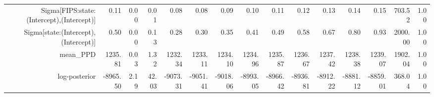 \begin{table}[ht]
\begin{tabular}{rrrrrrrrrrrrrrr}
  Sigma[FIPS:state:(Intercept),(Intercept)] & 0.11 & 0.00 & 0.01 & 0.08 & 0.08 & 0.09 & 0.10 & 0.11 & 0.12 & 0.13 & 0.14 & 0.15 & 703.52 & 1.00 \\ 
  Sigma[state:(Intercept),(Intercept)] & 0.50 & 0.00 & 0.13 & 0.28 & 0.30 & 0.35 & 0.41 & 0.49 & 0.58 & 0.67 & 0.80 & 0.93 & 2000.00 & 1.00 \\ 
  mean\_PPD & 1235.81 & 0.03 & 1.32 & 1232.34 & 1233.11 & 1234.10 & 1234.96 & 1235.87 & 1236.67 & 1237.42 & 1238.38 & 1239.07 & 1902.04 & 1.00 \\ 
  log-posterior & -8965.50 & 2.19 & 42.03 & -9073.31 & -9051.41 & -9018.06 & -8993.05 & -8966.42 & -8936.81 & -8912.22 & -8881.12 & -8859.01 & 368.04 & 1.00 \\ 
   \hline
\end{tabular}
\end{table}
